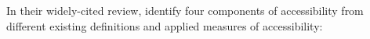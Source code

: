 


In their widely-cited review, \citet{Geurs2004AccessibilityReview} identify four components of accessibility 
from different existing definitions and applied measures of accessibility:

